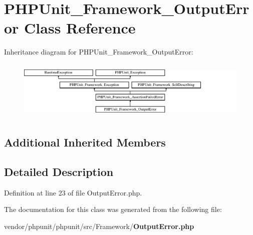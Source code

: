 \section{P\+H\+P\+Unit\+\_\+\+Framework\+\_\+\+Output\+Error Class Reference}
\label{class_p_h_p_unit___framework___output_error}
Inheritance diagram for P\+H\+P\+Unit\+\_\+\+Framework\+\_\+\+Output\+Error\+:\begin{figure}[H]
\begin{center}
\leavevmode
\includegraphics[height=2.860792cm]{class_p_h_p_unit___framework___output_error}
\end{center}
\end{figure}
\subsection*{Additional Inherited Members}


\subsection{Detailed Description}


Definition at line 23 of file Output\+Error.\+php.



The documentation for this class was generated from the following file\+:\begin{DoxyCompactItemize}
\item 
vendor/phpunit/phpunit/src/\+Framework/{\bf Output\+Error.\+php}\end{DoxyCompactItemize}
